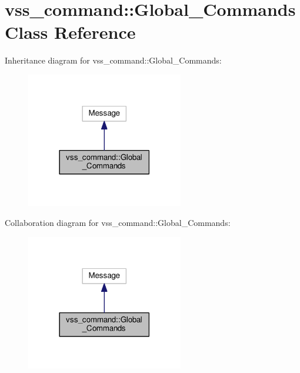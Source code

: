 \hypertarget{classvss__command_1_1Global__Commands}{\section{vss\-\_\-command\-:\-:Global\-\_\-\-Commands Class Reference}
\label{classvss__command_1_1Global__Commands}
}


Inheritance diagram for vss\-\_\-command\-:\-:Global\-\_\-\-Commands\-:
\nopagebreak
\begin{figure}[H]
\begin{center}
\leavevmode
\includegraphics[width=194pt]{classvss__command_1_1Global__Commands__inherit__graph}
\end{center}
\end{figure}


Collaboration diagram for vss\-\_\-command\-:\-:Global\-\_\-\-Commands\-:
\nopagebreak
\begin{figure}[H]
\begin{center}
\leavevmode
\includegraphics[width=194pt]{classvss__command_1_1Global__Commands__coll__graph}
\end{center}
\end{figure}
